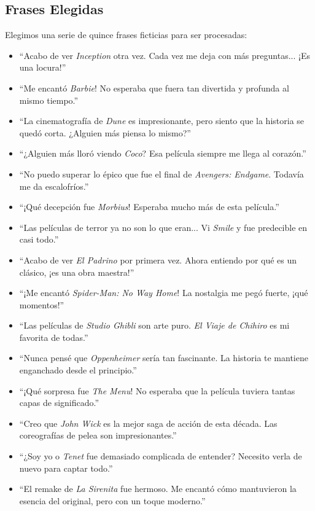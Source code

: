 \documentclass{article}
\begin{document}
    \subsection{Frases Elegidas}
    Elegimos una serie de quince frases ficticias para ser procesadas:
    \begin{itemize}
        \item ``Acabo de ver \textit{Inception} otra vez. Cada vez me deja con más preguntas... ¡Es una locura!''
        \item ``Me encantó \textit{Barbie}! No esperaba que fuera tan divertida y profunda al mismo tiempo.''
        \item ``La cinematografía de \textit{Dune} es impresionante, pero siento que la historia se quedó corta. ¿Alguien más piensa lo mismo?''
        \item ``¿Alguien más lloró viendo \textit{Coco}? Esa película siempre me llega al corazón.''
        \item ``No puedo superar lo épico que fue el final de \textit{Avengers: Endgame}. Todavía me da escalofríos.''
        \item ``¡Qué decepción fue \textit{Morbius}! Esperaba mucho más de esta película.''
        \item ``Las películas de terror ya no son lo que eran... Vi \textit{Smile} y fue predecible en casi todo.''
        \item  ``Acabo de ver \textit{El Padrino} por primera vez. Ahora entiendo por qué es un clásico, ¡es una obra maestra!''
        \item ``¡Me encantó \textit{Spider-Man: No Way Home}! La nostalgia me pegó fuerte, ¡qué momentos!''
        \item ``Las películas de \textit{Studio Ghibli} son arte puro. \textit{El Viaje de Chihiro} es mi favorita de todas.''
        \item ``Nunca pensé que \textit{Oppenheimer} sería tan fascinante. La historia te mantiene enganchado desde el principio.''
        \item ``¡Qué sorpresa fue \textit{The Menu}! No esperaba que la película tuviera tantas capas de significado.''
        \item ``Creo que \textit{John Wick} es la mejor saga de acción de esta década. Las coreografías de pelea son impresionantes.''
        \item ``¿Soy yo o \textit{Tenet} fue demasiado complicada de entender? Necesito verla de nuevo para captar todo.''
        \item ``El remake de \textit{La Sirenita} fue hermoso. Me encantó cómo mantuvieron la esencia del original, pero con un toque moderno.''
    \end{itemize}
\end{document}
